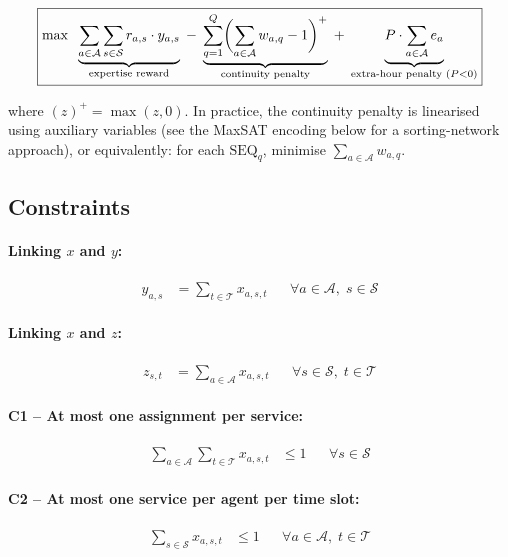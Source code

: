 \documentclass[11pt,a4paper]{article}
\newcommand{\setA}{\mathcal{A}}
\newcommand{\setS}{\mathcal{S}}
\newcommand{\setT}{\mathcal{T}}
\newcommand{\SEQ}{\mathrm{SEQ}}
\begin{document}
\begin{equation}\label{eq:obj}
\boxed{%
\max \;\;
\underbrace{\sum_{a \in \setA}\sum_{s \in \setS} r_{a,s} \cdot y_{a,s}}_{\text{expertise reward}}
\;-\;
\underbrace{\sum_{q=1}^{Q} \biggl(\sum_{a \in \setA} w_{a,q} - 1\biggr)^{+}}_{\text{continuity penalty}}
\;+\;
\underbrace{P \cdot \sum_{a \in \setA} e_a}_{\text{extra-hour penalty (}P < 0\text{)}}
}
\end{equation}

\noindent
where $(z)^{+} = \max(z, 0)$.  In practice, the continuity penalty is linearised
using auxiliary variables (see the MaxSAT encoding below for a sorting-network
approach), or equivalently: for each $\SEQ_q$, minimise
$\sum_{a \in \setA} w_{a,q}$.

\subsection{Constraints}

\paragraph{Linking $x$ and $y$:}
\begin{align}
    y_{a,s} &= \sum_{t \in \setT} x_{a,s,t}
    && \forall a \in \setA,\; s \in \setS \label{eq:link-xy}
\end{align}

\paragraph{Linking $x$ and $z$:}
\begin{align}
    z_{s,t} &= \sum_{a \in \setA} x_{a,s,t}
    && \forall s \in \setS,\; t \in \setT \label{eq:link-xz}
\end{align}

\paragraph{C1 -- At most one assignment per service:}
\begin{align}
    \sum_{a \in \setA}\sum_{t \in \setT} x_{a,s,t} &\le 1
    && \forall s \in \setS \label{eq:c1}
\end{align}

\paragraph{C2 -- At most one service per agent per time slot:}
\begin{align}
    \sum_{s \in \setS} x_{a,s,t} &\le 1
    && \forall a \in \setA,\; t \in \setT \label{eq:c2}
\end{align}
\end{document}
